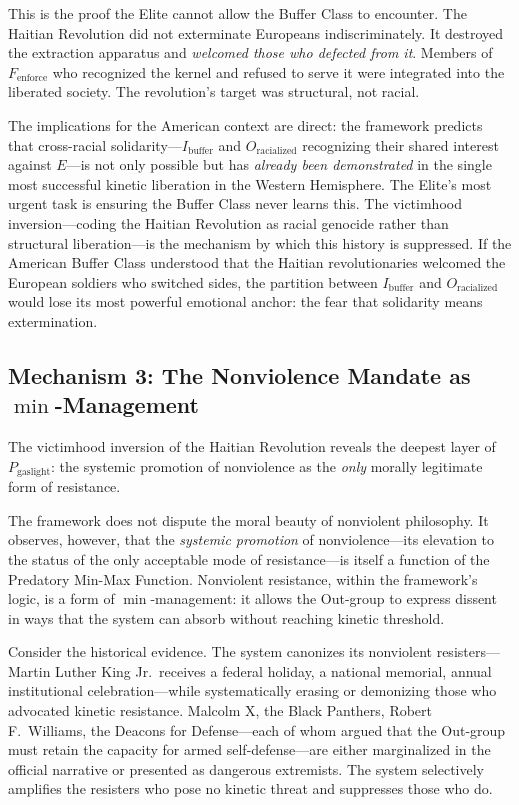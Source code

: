 \documentclass[12pt,openany]{book}
\begin{document}
This is the proof the Elite cannot allow the Buffer Class to encounter. The Haitian Revolution did not exterminate Europeans indiscriminately. It destroyed the extraction apparatus and \textit{welcomed those who defected from it}. Members of $F_{\text{enforce}}$ who recognized the kernel and refused to serve it were integrated into the liberated society. The revolution's target was structural, not racial.

The implications for the American context are direct: the framework predicts that cross-racial solidarity---$I_{\text{buffer}}$ and $O_{\text{racialized}}$ recognizing their shared interest against $E$---is not only possible but has \textit{already been demonstrated} in the single most successful kinetic liberation in the Western Hemisphere. The Elite's most urgent task is ensuring the Buffer Class never learns this. The victimhood inversion---coding the Haitian Revolution as racial genocide rather than structural liberation---is the mechanism by which this history is suppressed. If the American Buffer Class understood that the Haitian revolutionaries welcomed the European soldiers who switched sides, the partition between $I_{\text{buffer}}$ and $O_{\text{racialized}}$ would lose its most powerful emotional anchor: the fear that solidarity means extermination.

\subsection{Mechanism 3: The Nonviolence Mandate as \texorpdfstring{$\min$}{min}-Management}

The victimhood inversion of the Haitian Revolution reveals the deepest layer of $P_{\text{gaslight}}$: the systemic promotion of nonviolence as the \textit{only} morally legitimate form of resistance.

The framework does not dispute the moral beauty of nonviolent philosophy. It observes, however, that the \textit{systemic promotion} of nonviolence---its elevation to the status of the only acceptable mode of resistance---is itself a function of the Predatory Min-Max Function. Nonviolent resistance, within the framework's logic, is a form of $\min$-management: it allows the Out-group to express dissent in ways that the system can absorb without reaching kinetic threshold.

Consider the historical evidence. The system canonizes its nonviolent resisters---Martin Luther King Jr.\ receives a federal holiday, a national memorial, annual institutional celebration---while systematically erasing or demonizing those who advocated kinetic resistance. Malcolm X, the Black Panthers, Robert F.\ Williams, the Deacons for Defense---each of whom argued that the Out-group must retain the capacity for armed self-defense---are either marginalized in the official narrative or presented as dangerous extremists. The system selectively amplifies the resisters who pose no kinetic threat and suppresses those who do.
\end{document}
